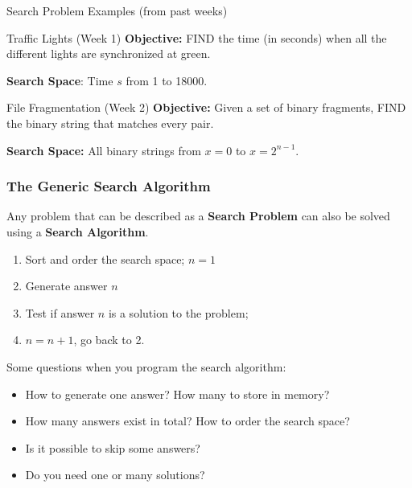 \begin{frame}{Search Problem Examples (from past weeks)}
  \begin{block}{Traffic Lights (Week 1)}
    {\bf Objective:} FIND the time (in seconds) when all the different lights are synchronized at green.
    \bigskip

    {\bf Search Space}: Time $s$ from 1 to 18000.
  \end{block}

  \begin{block}{File Fragmentation (Week 2)}
    {\bf Objective:} Given a set of binary fragments, FIND the binary string that matches every pair.
    \bigskip

    {\bf Search Space:} All binary strings from $x = 0$ to $x = 2^{n-1}$.
  \end{block}
\end{frame}


\begin{frame}
  \frametitle{The Generic Search Algorithm}
  Any problem that can be described as a {\bf Search Problem} can also be solved using a {\bf Search Algorithm}.
  \begin{enumerate}
    \item Sort and order the search space; $n = 1$
    \item Generate answer $n$
    \item Test if answer $n$ is a solution to the problem;
    \item $n = n+1$, go back to 2.
  \end{enumerate}\bigskip

  Some questions when you program the search algorithm:
  \begin{itemize}
  \item How to generate one answer? How many to store in memory?
  \item How many answers exist in total? How to order the search space?
  \item Is it possible to skip some answers?
  \item Do you need one or many solutions?
  \end{itemize}
\end{frame}

